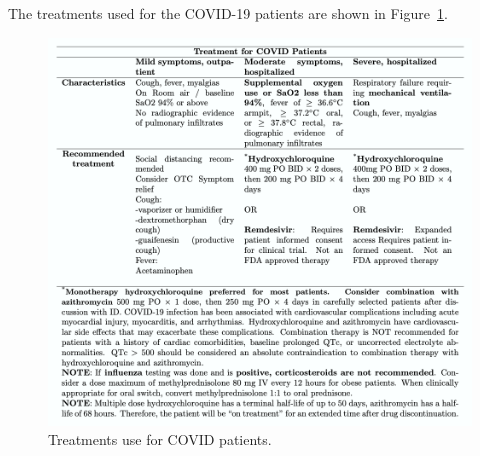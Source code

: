 The treatments used for the COVID-19 patients are shown in Figure~\ref{Supp:TreatmentCovidPatient}.



\begin{figure}
\centering
	\includegraphics[width=0.9\linewidth]{../Figures/TreatmentCOVIDPatients.png}
    \caption{ Treatments use for COVID patients.}
        \label{Supp:TreatmentCovidPatient}
\end{figure}










